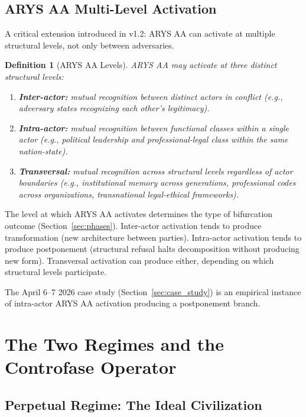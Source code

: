 \documentclass[12pt,a4paper]{article}
\newtheorem{definition}{Definition}[section]
\begin{document}
\subsection{ARYS AA Multi-Level Activation}

A critical extension introduced in v1.2: ARYS AA can activate at multiple structural levels, not only between adversaries.

\begin{definition}[ARYS AA Levels]\label{def:arys_levels}
ARYS AA may activate at three distinct structural levels:
\begin{enumerate}[label=(\alph*)]
    \item \textbf{Inter-actor:} mutual recognition between distinct actors in conflict (e.g., adversary states recognizing each other's legitimacy).
    \item \textbf{Intra-actor:} mutual recognition between functional classes within a single actor (e.g., political leadership and professional-legal class within the same nation-state).
    \item \textbf{Transversal:} mutual recognition across structural levels regardless of actor boundaries (e.g., institutional memory across generations, professional codes across organizations, transnational legal-ethical frameworks).
\end{enumerate}
\end{definition}

The level at which ARYS AA activates determines the type of bifurcation outcome (Section~\ref{sec:phases}). Inter-actor activation tends to produce transformation (new architecture between parties). Intra-actor activation tends to produce postponement (structural refusal halts decomposition without producing new form). Transversal activation can produce either, depending on which structural levels participate.

The April 6--7 2026 case study (Section~\ref{sec:case_study}) is an empirical instance of intra-actor ARYS AA activation producing a postponement branch.


\section{The Two Regimes and the Controfase Operator}\label{sec:regimes}

\subsection{Perpetual Regime: The Ideal Civilization}
\end{document}
